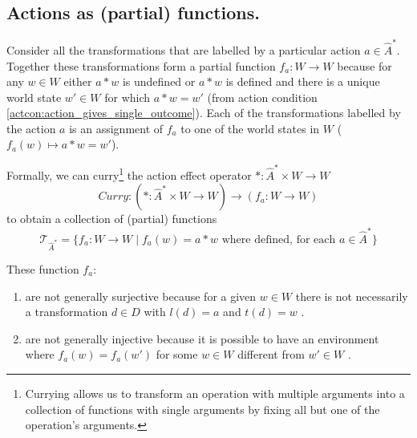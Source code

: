 \subsection{Actions as (partial) functions.}

Consider all the transformations that are labelled by a particular action $a \in \hat{A}^{\ast}$.
Together these transformations form a partial function $f_{a}: W \to W$ because for any $w \in W$ either $a \ast w$ is undefined or $a \ast w$ is defined and there is a unique world state $w' \in W$ for which $a \ast w = w'$ (from action condition \ref{actcon:action_gives_single_outcome}).
Each of the transformations labelled by the action $a$ is an assignment of $f_{a}$ to one of the world states in $W$ ($f_{a}(w) \mapsto a \ast w = w'$).

Formally, we can curry\footnote{Currying allows us to transform an operation with multiple arguments into a collection of functions with single arguments by fixing all but one of the operation's arguments.} the action effect operator $\ast : \hat{A}^{\ast} \times W \to W$
\begin{equation}
	\textit{Curry}: (\ast: \hat{A}^{\ast} \times W \to W) \to (f_{a}: W \to W)
\end{equation}
to obtain a collection of (partial) functions
\begin{equation}
	\mathcal{T}_{\hat{A}^{\ast}} = \{f_{a}: W \to W \mid f_{a}(w) = a \ast w \text{ where defined, for each } a \in \hat{A}^{\ast} \}
\end{equation}

These function $f_{a}$:
\begin{enumerate}
	\item are not generally surjective because for a given $w \in W$ there is not necessarily a transformation $d \in D$ with $l(d) = a$ and $t(d) = w$ .

	\item are not generally injective because it is possible to have an environment where $f_{a}(w)=f_{a}(w')$ for some $w \in W$ different from $w' \in W$ .
\end{enumerate}


